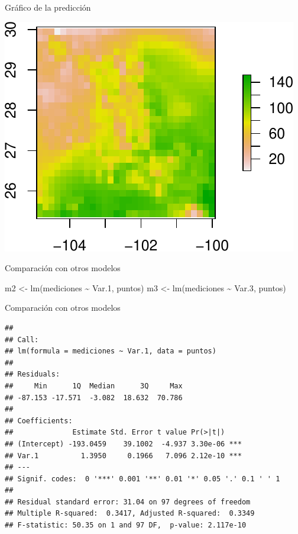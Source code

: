 \documentclass[
  11pt,
  ignorenonframetext,
]{beamer}
\newenvironment{Shaded}{}{}
\newcommand{\FloatTok}[1]{\textcolor[rgb]{0.25,0.63,0.44}{#1}}
\newcommand{\FunctionTok}[1]{\textcolor[rgb]{0.02,0.16,0.49}{#1}}
\newcommand{\NormalTok}[1]{#1}
\newcommand{\OtherTok}[1]{\textcolor[rgb]{0.00,0.44,0.13}{#1}}
\newcommand{\SpecialCharTok}[1]{\textcolor[rgb]{0.25,0.44,0.63}{#1}}
\begin{document}
\begin{frame}{Gráfico de la predicción}
\protect\hypertarget{gruxe1fico-de-la-predicciuxf3n}{}
\begin{center}\includegraphics{Regresion_files/figure-beamer/unnamed-chunk-15-1} \end{center}
\end{frame}

\begin{frame}[fragile]{Comparación con otros modelos}
\protect\hypertarget{comparaciuxf3n-con-otros-modelos}{}
\begin{Shaded}
\begin{Highlighting}[]
\NormalTok{m2 }\OtherTok{\textless{}{-}} \FunctionTok{lm}\NormalTok{(mediciones }\SpecialCharTok{\textasciitilde{}}\NormalTok{ Var}\FloatTok{.1}\NormalTok{, puntos)}
\NormalTok{m3 }\OtherTok{\textless{}{-}} \FunctionTok{lm}\NormalTok{(mediciones }\SpecialCharTok{\textasciitilde{}}\NormalTok{ Var}\FloatTok{.3}\NormalTok{, puntos)}
\end{Highlighting}
\end{Shaded}
\end{frame}

\begin{frame}[fragile]{Comparación con otros modelos}
\protect\hypertarget{comparaciuxf3n-con-otros-modelos-1}{}
\begin{verbatim}
## 
## Call:
## lm(formula = mediciones ~ Var.1, data = puntos)
## 
## Residuals:
##     Min      1Q  Median      3Q     Max 
## -87.153 -17.571  -3.082  18.632  70.786 
## 
## Coefficients:
##              Estimate Std. Error t value Pr(>|t|)    
## (Intercept) -193.0459    39.1002  -4.937 3.30e-06 ***
## Var.1          1.3950     0.1966   7.096 2.12e-10 ***
## ---
## Signif. codes:  0 '***' 0.001 '**' 0.01 '*' 0.05 '.' 0.1 ' ' 1
## 
## Residual standard error: 31.04 on 97 degrees of freedom
## Multiple R-squared:  0.3417, Adjusted R-squared:  0.3349 
## F-statistic: 50.35 on 1 and 97 DF,  p-value: 2.117e-10
\end{verbatim}
\end{frame}
\end{document}
